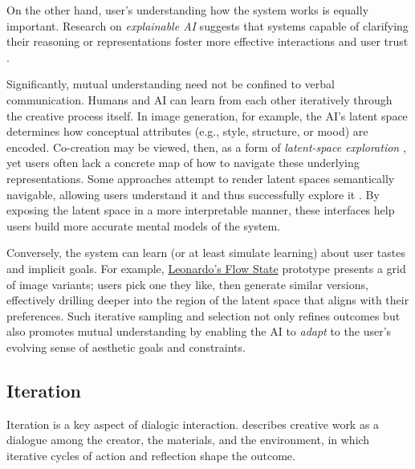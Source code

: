 On the other hand, user's understanding how the system works is equally important. Research on \textit{explainable AI} suggests that systems capable of clarifying their reasoning or representations foster more effective interactions and user trust \citep{Ribeiro2016-xb,Doshi-Velez2017-qv}.

Significantly, mutual understanding need not be confined to verbal communication. Humans and AI can learn from each other iteratively through the creative process itself. In image generation, for example, the AI's latent space determines how conceptual attributes (e.g., style, structure, or mood) are encoded. Co-creation may be viewed, then, as a form of \textit{latent-space exploration} \citep{Loh2024-fb,Smith2022-dm}, yet users often lack a concrete map of how to navigate these underlying representations. Some approaches attempt to render latent spaces semantically navigable, allowing users understand it and thus successfully explore it \citep{Prathyush2024-ly, Harkonen2020-eu, Davis2024-ml}. By exposing the latent space in a more interpretable manner, these interfaces help users build more accurate mental models of the system.

Conversely, the system can learn (or at least simulate learning) about user tastes and implicit goals. For example, \href{app.leonardo.ai/}{Leonardo's Flow State} prototype presents a grid of image variants; users pick one they like, then generate similar versions, effectively drilling deeper into the region of the latent space that aligns with their preferences. Such iterative sampling and selection not only refines outcomes but also promotes mutual understanding by enabling the AI to \textit{adapt} to the user's evolving sense of aesthetic goals and constraints.

\subsection{Iteration}

Iteration is a key aspect of dialogic interaction. \citet{Schon1987-fy,Schon1992-jt} describes creative work as a dialogue among the creator, the materials, and the environment, in which iterative cycles of action and reflection shape the outcome. 

